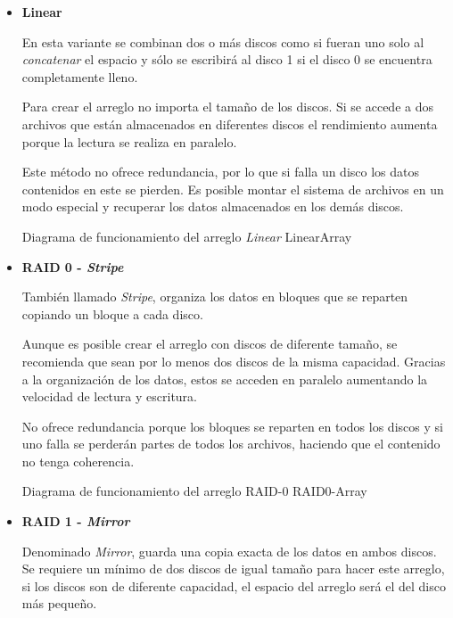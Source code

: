 \begin{itemize}

  \item \textbf{Linear}

En esta variante se combinan dos o m\'{a}s discos como si fueran uno solo al \emph{concatenar} el espacio y s\'{o}lo se escribir\'{a} al disco 1 si el disco 0 se encuentra completamente lleno.

Para crear el arreglo no importa el tama\~{n}o de los discos. Si se accede a dos archivos que est\'{a}n almacenados en diferentes discos el rendimiento aumenta porque la lectura se realiza en paralelo.

Este m\'{e}todo no ofrece redundancia, por lo que si falla un disco los datos contenidos en este se pierden. Es posible montar el sistema de archivos en un modo especial y recuperar los datos almacenados en los dem\'{a}s discos.

\diagramblock
{Diagrama de funcionamiento del arreglo \emph{Linear}}
{LinearArray}
{
 {
  
 }
}

  \item \textbf{RAID 0 - \textit{Stripe}}

Tambi\'{e}n llamado \emph{Stripe}, organiza los datos en bloques que se reparten copiando un bloque a cada disco.

Aunque es posible crear el arreglo con discos de diferente tama\~{n}o, se recomienda que sean por lo menos dos discos de la misma capacidad. Gracias a la organizaci\'{o}n de los datos, estos se acceden en paralelo aumentando la velocidad de lectura y escritura.

No ofrece redundancia porque los bloques se reparten en todos los discos y si uno falla se perder\'{a}n partes de todos los archivos, haciendo que el contenido no tenga coherencia.

\diagramblock
{Diagrama de funcionamiento del arreglo \textsc{RAID-0}}
{RAID0-Array}
{
 {
  
 }
}

  \item \textbf{RAID 1 - \textit{Mirror}}

Denominado \emph{Mirror}, guarda una copia exacta de los datos en ambos discos. Se requiere un m\'{i}nimo de dos discos de igual tama\~{n}o para hacer este arreglo, si los discos son de diferente capacidad, el espacio del arreglo ser\'{a} el del disco m\'{a}s peque\~{n}o.


\end{itemize}
